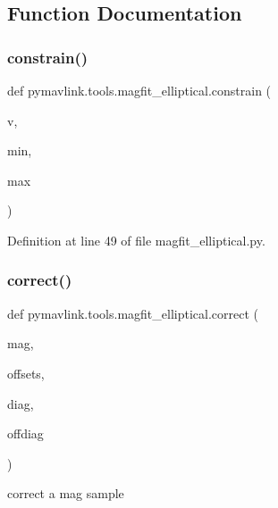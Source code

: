 \subsection{Function Documentation}
\mbox{\label{namespacepymavlink_1_1tools_1_1magfit__elliptical_a400fcffd87709a20566085cd6bf5bc25}} 
\subsubsection{\texorpdfstring{constrain()}{constrain()}}
{\footnotesize\ttfamily def pymavlink.\+tools.\+magfit\+\_\+elliptical.\+constrain (\begin{DoxyParamCaption}\item[{}]{v,  }\item[{}]{min,  }\item[{}]{max }\end{DoxyParamCaption})}



Definition at line 49 of file magfit\+\_\+elliptical.\+py.

\mbox{\label{namespacepymavlink_1_1tools_1_1magfit__elliptical_a20fabb2795bcf794156ea4dcd0de400a}} 
\subsubsection{\texorpdfstring{correct()}{correct()}}
{\footnotesize\ttfamily def pymavlink.\+tools.\+magfit\+\_\+elliptical.\+correct (\begin{DoxyParamCaption}\item[{}]{mag,  }\item[{}]{offsets,  }\item[{}]{diag,  }\item[{}]{offdiag }\end{DoxyParamCaption})}

\begin{DoxyVerb}correct a mag sample\end{DoxyVerb}
 

